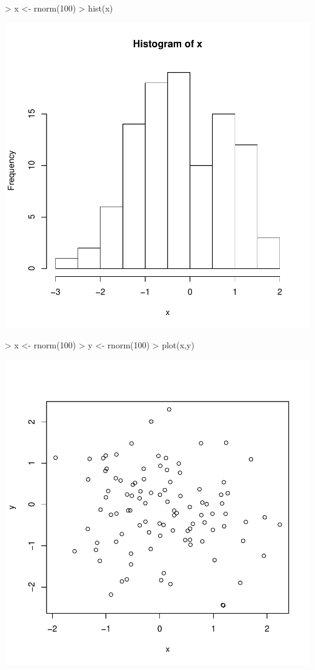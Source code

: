 \documentclass{article}
\begin{document}


\begin{Schunk}
\begin{Sinput}
> x <- rnorm(100)
> hist(x)
\end{Sinput}
\end{Schunk}
\includegraphics{APBTestBasics-C1}

\begin{Schunk}
\begin{Sinput}
> x <- rnorm(100)
> y <- rnorm(100)
> plot(x,y)
\end{Sinput}
\end{Schunk}
\includegraphics{APBTestBasics-examplePlot}
\end{document}
